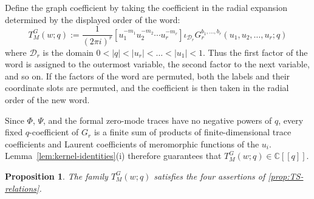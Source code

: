 \documentclass[11pt,a4paper]{amsart}
\numberwithin{equation}{section}
\newtheorem{proposition}[theorem]{Proposition}
\theoremstyle{definition}
\theoremstyle{remark}
\newcommand{\CC}{\mathbb C}
\newcommand{\ii}{i}
\newcommand{\scrD}{\mathscr D}
\begin{document}
Define the graph coefficient by taking the coefficient in the radial
expansion determined by the displayed order of the word:
\begin{equation}
 T^G_M(w;q):=\frac1{(2\pi\ii)^r}
 \left[u_1^{-m_1}u_2^{-m_2}\cdots u_r^{-m_r}\right]
 \iota_{\scrD_r}G_r^{b_1,\ldots,b_r}(u_1,u_2,\ldots,u_r;q)
 \label{eq:TG-definition}
\end{equation}
where  $\scrD_r$ is the domain $  0 < |q| < |u_r| < \dots < |u_1| < 1 $. Thus the first factor of the word is assigned to the outermost variable, the second factor to the next variable, and so on.  If the factors of the word are permuted, both the labels and their coordinate slots are permuted,
and the coefficient is then taken in the radial order of the new word.

Since $\Phi$, $\Psi$, and the formal zero-mode traces have no negative
powers of $q$, every fixed $q$-coefficient of $G_r$ is a finite sum of
products of finite-dimensional trace coefficients and Laurent
coefficients of meromorphic functions of the $u_i$.
Lemma~\ref{lem:kernel-identities}(i) therefore guarantees that
$T^G_M(w;q)\in\CC[[q]]$.

\begin{proposition}
\label{prop:TG-relations}
The family $T^G_M(w;q)$ satisfies the four assertions of \cref{prop:TS-relations}.
\end{proposition}
\end{document}
